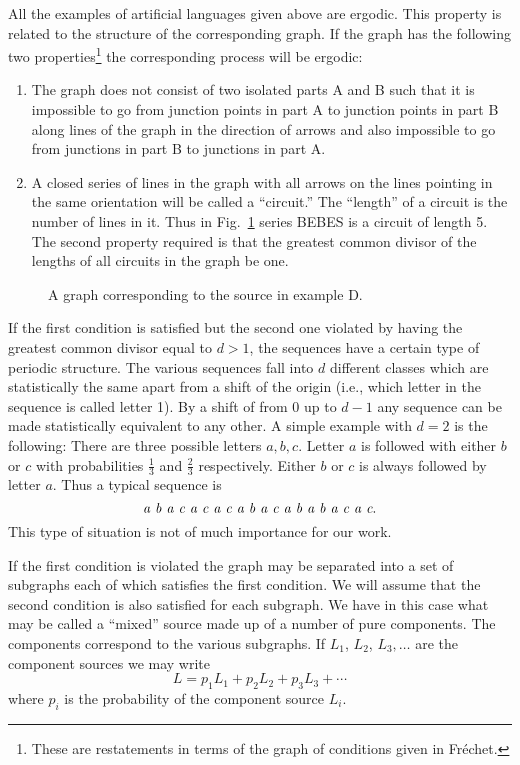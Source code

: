 All the examples of artificial languages given above are ergodic.
This property is related to the structure of the corresponding graph.
If the graph has the following two properties\footnote{These are
restatements in terms of the graph of conditions given in Fr\'echet.}
the corresponding process will be ergodic:
\begin{enumerate}
\item
The graph does not consist of two isolated parts A and B such that it
is impossible to go from junction points in part A to junction points
in part B along lines of the graph in the direction of arrows and also
impossible to go from junctions in part B to junctions in part A.
\item
A closed series of lines in the graph with all arrows on the lines
pointing in the same orientation will be called a ``circuit.''
The ``length'' of a circuit is the number of lines in it.  Thus in
Fig.~\ref{fig:5} series BEBES is a circuit of length 5.  The second
property required is that the greatest common divisor of the lengths of
all circuits in the graph be one.
\end{enumerate}

\begin{figure}[ht]
\centerline{}
\caption{A graph corresponding to the source in example D.}
\label{fig:5}
\end{figure}

If the first condition is satisfied but the second one violated by
having the greatest common divisor equal to $d>1$, the sequences have a
certain type of periodic structure.  The various sequences fall into $d$
different classes which are statistically the same apart from a shift
of the origin (i.e., which letter in the sequence is called letter 1).
By a shift of from 0 up to $d-1$ any sequence can be made statistically
equivalent to any other.  A simple example with $d=2$ is the following:
There are three possible letters $a,b,c$.  Letter $a$ is followed with
either $b$ or $c$ with probabilities $\frac13$ and $\frac23$
respectively.  Either $b$ or $c$ is always followed by letter $a$.
Thus a typical sequence is
$$
\text{\itshape a b a c a c a c a b a c a b a b a c a c}.
$$
This type of situation is not of much importance for our work.

If the first condition is violated the graph may be separated into a set
of subgraphs each of which satisfies the first condition.  We will assume
that the second condition is also satisfied for each subgraph.  We have
in this case what may be called a ``mixed'' source made up of a number
of pure components.  The components correspond to the various subgraphs.
If $L_1$, $L_2$, $L_3,\dots$ are the component sources we may write
$$
L = p_1 L_1 + p_2 L_2 + p_3 L_3 + \dotsb
$$
where $p_i$ is the probability of the component source $L_i$.

